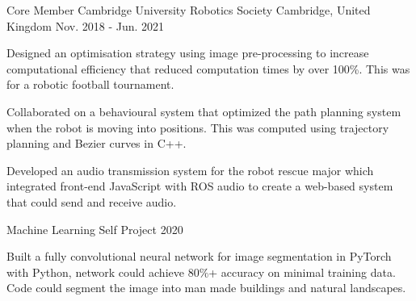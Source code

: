 

\begin{cventries}

  \cventry
    {Core Member} %
    {Cambridge University Robotics Society} %
    {Cambridge, United Kingdom} %
    {Nov. 2018 - Jun. 2021} %
    {
      \begin{cvitems} %
        \item {Designed an optimisation strategy using image pre-processing to increase computational efficiency that reduced computation times by over 100\%. This was for a robotic football tournament.}
        \item {Collaborated on a behavioural system that optimized the path planning system when the robot is moving into positions. This was computed using trajectory planning and Bezier curves in C++.}
        \item {Developed an audio transmission system for the robot rescue major which integrated front-end JavaScript with ROS audio to create a web-based system that could send and receive audio.}
      \end{cvitems}
    }

  \cventry
    {} %
    {Machine Learning Self Project} %
    {2020} %
    {} %
    {
      \begin{cvitems} %
        \item {Built a fully convolutional neural network for image segmentation in PyTorch with Python, network could achieve 80\%+ accuracy on minimal training data. Code could segment the image into man made buildings and natural landscapes.}
      \end{cvitems}
    }
\end{cventries}
